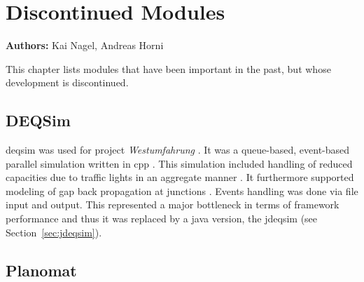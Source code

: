 \chapter{Discontinued Modules}
\label{ch:discontinued}

\hfill \textbf{Authors:} Kai Nagel, Andreas Horni

This chapter lists modules that have been important in the past, but whose development is discontinued.

\section{DEQSim}
\label{sec:deqsim}
\gls{deqsim} was used for project \emph{Westumfahrung} \citep[][]{BalmerEtAl_ResRep_bdktzrh_2009}. It was a queue-based, event-based parallel simulation written in \gls{cpp} \citep[][]{CharyparEtAl_TRR_2007, Charypar_PhDThesis_2008}. This simulation included handling of reduced capacities due to traffic lights in an aggregate manner \citep[][p.139 ff]{Charypar_PhDThesis_2008}. It furthermore supported modeling of gap back propagation at junctions \citep[][p.98 ff]{Charypar_PhDThesis_2008}. Events handling was done via file input and output. This represented a major bottleneck in terms of framework performance and thus it was replaced by a \gls{java} version, the \gls{jdeqsim} (see Section~\ref{sec:jdeqsim}).

\section{Planomat}
\label{sec:planomat}

